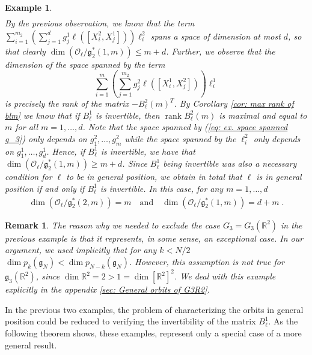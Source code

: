 \documentclass[pdflatex,sn-mathphys-num]{sn-jnl}
\theoremstyle{thmstyletwo}
\theoremstyle{thmstyleone}
\theoremstyle{thmstyletwo}
\newtheorem{example}[definition]{Example}
\newtheorem{remark}[definition]{Remark}
\newcommand{\fancyg}{\mathfrak{g}}
\newcommand{\R}{\mathbb{R}}
\newcommand{\rank}{\operatorname{rank}}
\begin{document}
\begin{example}
\begin{align*}
		\end{align*}
		By the previous observation, we know that the term
		$\sum_{i=1}^{m_2}\left(\sum_{j=1}^{d} g_j^1\ell([X_i^2,X_j^1])\right)\ell_i^2$
		spans a space of dimension at most $d$, so that clearly $\dim\left(\mathcal{O}_{\ell}/\fancyg_{2}^*(1, m)\right) \leq m +d$. Further, we observe that the dimension of the space spanned by the term
		\begin{equation}\label{eq: ex. space spanned g_3}
			\sum_{i=1}^m \left(\sum_{j=1}^{m_2} g_j^2\ell([X_i^1,X_j^2])\right)\ell_i^1
		\end{equation}
		is precisely the rank of the matrix $-B_{\ell}^2(m)^T$. By Corollary \ref{cor: max rank of blm} we know that if $B_{\ell}^1$ is invertible, then $\rank B_{\ell}^2(m)$ is maximal and equal to $m$ for all $m =1, \ldots, d$. 
		Note that the space spanned by (\ref{eq: ex. space spanned g_3}) only depends on $g_1^2, \ldots, g_m^2$ while the space spanned by the $\ell_i^2$ only depends on $g_1^1,\ldots,g_d^1$. Hence, if $B_{\ell}^1$ is invertible, we have that  $\dim\left(\mathcal{O}_{\ell}/\fancyg_{2}^*(1, m)\right) \geq m +d$. Since $B_{\ell}^1$ being invertible was also a necessary condition for $\ell$ to be in general position, we obtain in total that $\ell$ is in general position if and only if $B_{\ell}^1$ is invertible. In this case, for any $m = 1, \ldots, d$
		\begin{align*}
			\dim\left(\mathcal{O}_{\ell}/\fancyg_{2}^*(2, m)\right) = m \quad \text{and} \quad
			\dim\left(\mathcal{O}_{\ell}/\fancyg_{2}^*(1, m)\right) = d + m \;.
		\end{align*}
	\end{example}
	\begin{remark}
		The reason why we needed to exclude the case $G_3 = G_3(\R^2)$ in the previous example is that it represents, in some sense, an exceptional case. In our argument, we used implicitly that for any $k<N/2$ $\dim p_k(\fancyg_N)< \dim p_{N-k}(\fancyg_N)$. However, this assumption is not true for $\fancyg_3(\R^2)$, since $\dim \R^2 = 2 > 1 = \dim [\R^2]^2$. We deal with this example  explicitly in the appendix \ref{sec: General orbits of G3R2}.
	\end{remark}
	In the previous two examples, the problem of characterizing the orbits in general position could be reduced to verifying the invertibility of the matrix $B_{\ell}^1$. As the following theorem shows, these examples, represent only a special case of a more general result.
\end{document}
